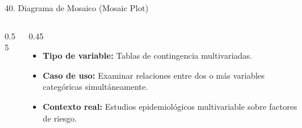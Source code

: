 \documentclass[aspectratio=169,10pt]{beamer}
\begin{document}
\begin{frame}{40. Diagrama de Mosaico (Mosaic Plot)}
\begin{columns}
\begin{column}{0.55\textwidth}
\end{column}
\begin{column}{0.45\textwidth}
\begin{itemize}\small
\item \textbf{Tipo de variable:} Tablas de contingencia multivariadas.
\item \textbf{Caso de uso:} Examinar relaciones entre dos o más variables categóricas simultáneamente.
\item \textbf{Contexto real:} Estudios epidemiológicos multivariable sobre factores de riesgo.
\end{itemize}
\end{column}
\end{columns}
\end{frame}
\end{document}
